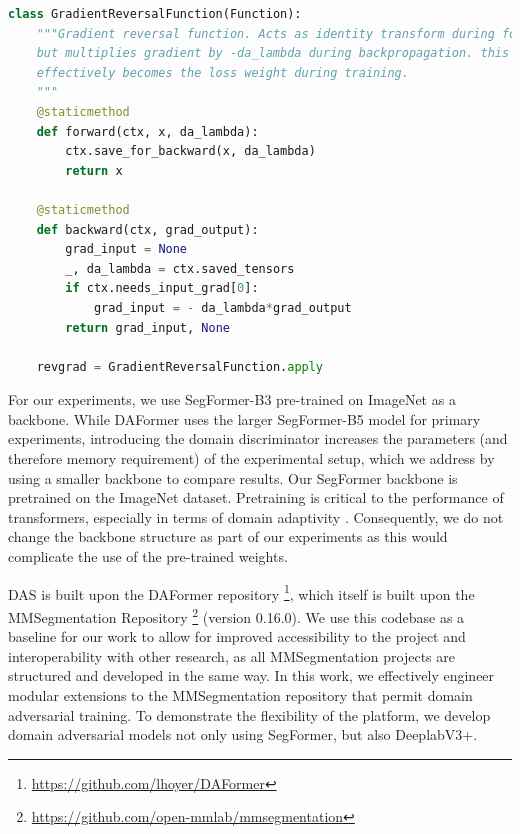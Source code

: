 \documentclass[a4paper,12pt]{report}
\begin{document}
\hspace*{4mm}
\begin{lstlisting}[language=Python, caption=Gradient reversal function implemented in PyTorch. Based on \url{https://github.com/tadeephuy/GradientReversal}]
class GradientReversalFunction(Function):
    """Gradient reversal function. Acts as identity transform during forward pass, 
    but multiplies gradient by -da_lambda during backpropagation. this means da_lambda 
    effectively becomes the loss weight during training.
    """
    @staticmethod
    def forward(ctx, x, da_lambda):
        ctx.save_for_backward(x, da_lambda)
        return x
    
    @staticmethod
    def backward(ctx, grad_output):
        grad_input = None
        _, da_lambda = ctx.saved_tensors
        if ctx.needs_input_grad[0]:
            grad_input = - da_lambda*grad_output
        return grad_input, None

    revgrad = GradientReversalFunction.apply
\end{lstlisting}

For our experiments, we use SegFormer-B3 \cite{xie_segformer_2021} pre-trained on ImageNet as a backbone. While DAFormer uses the larger SegFormer-B5 model for primary experiments, introducing the domain discriminator increases the parameters (and therefore memory requirement) of the experimental setup, which we address by using a smaller backbone to compare results. Our SegFormer backbone is pretrained on the ImageNet dataset. Pretraining is critical to the performance of transformers, especially in terms of domain adaptivity \cite{dosovitskiy_image_2021}. Consequently, we do not change the backbone structure as part of our experiments as this would complicate the use of the pre-trained weights.

DAS is built upon the DAFormer \cite{hoyer_daformer_2022} repository \footnote{\url{https://github.com/lhoyer/DAFormer}}, which itself is built upon the MMSegmentation Repository \footnote{\url{https://github.com/open-mmlab/mmsegmentation}} (version 0.16.0). We use this codebase as a baseline for our work to allow for improved accessibility to the project and interoperability with other research, as all MMSegmentation projects are structured and developed in the same way. In this work, we effectively engineer modular extensions to the MMSegmentation repository that permit domain adversarial training. To demonstrate the flexibility of the platform, we develop domain adversarial models not only using SegFormer, but also DeeplabV3+.
\end{document}
